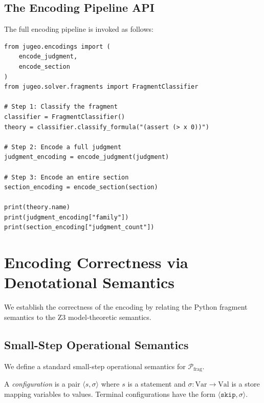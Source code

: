 \documentclass[11pt]{article}
\newcommand{\PythonFrag}{\mathcal{P}_{\mathrm{frag}}}
\begin{document}
\subsection{The Encoding Pipeline API}

The full encoding pipeline is invoked as follows:

\begin{lstlisting}[style=jugeo-python]
from jugeo.encodings import (
    encode_judgment,
    encode_section
)
from jugeo.solver.fragments import FragmentClassifier

# Step 1: Classify the fragment
classifier = FragmentClassifier()
theory = classifier.classify_formula("(assert (> x 0))")

# Step 2: Encode a full judgment
judgment_encoding = encode_judgment(judgment)

# Step 3: Encode an entire section
section_encoding = encode_section(section)

print(theory.name)
print(judgment_encoding["family"])
print(section_encoding["judgment_count"])
\end{lstlisting}

\section{Encoding Correctness via Denotational Semantics}\label{sec:denotational}

We establish the correctness of the encoding by relating the
Python fragment semantics to the Z3 model-theoretic semantics.

\subsection{Small-Step Operational Semantics}

We define a standard small-step operational semantics for $\PythonFrag$.

\begin{definition}[Configurations]\label{def:config}
A \emph{configuration} is a pair $\langle s, \sigma \rangle$ where $s$
is a statement and $\sigma : \mathrm{Var} \to \mathrm{Val}$ is a store
mapping variables to values.  Terminal configurations have the form
$\langle \mathtt{skip}, \sigma \rangle$.
\end{definition}
\end{document}
